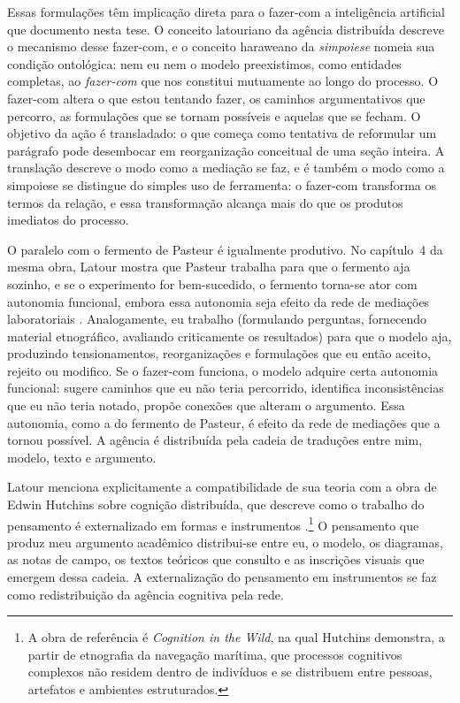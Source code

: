 Essas formulações têm implicação direta para o fazer-com a inteligência artificial que documento nesta tese. O conceito latouriano da agência distribuída descreve o mecanismo desse fazer-com, e o conceito haraweano da \textit{simpoiese} nomeia sua condição ontológica: nem eu nem o modelo preexistimos, como entidades completas, ao \textit{fazer-com} que nos constitui mutuamente ao longo do processo. O fazer-com altera o que estou tentando fazer, os caminhos argumentativos que percorro, as formulações que se tornam possíveis e aquelas que se fecham. O objetivo da ação é transladado: o que começa como tentativa de reformular um parágrafo pode desembocar em reorganização conceitual de uma seção inteira. A translação descreve o modo como a mediação se faz, e é também o modo como a simpoiese se distingue do simples uso de ferramenta: o fazer-com transforma os termos da relação, e essa transformação alcança mais do que os produtos imediatos do processo.

O paralelo com o fermento de Pasteur é igualmente produtivo. No capítulo~4 da mesma obra, Latour mostra que Pasteur trabalha para que o fermento aja sozinho, e se o experimento for bem-sucedido, o fermento torna-se ator com autonomia funcional, embora essa autonomia seja efeito da rede de mediações laboratoriais \parencite{Latour2017Esperanca}. Analogamente, eu trabalho (formulando perguntas, fornecendo material etnográfico, avaliando criticamente os resultados) para que o modelo aja, produzindo tensionamentos, reorganizações e formulações que eu então aceito, rejeito ou modifico. Se o fazer-com funciona, o modelo adquire certa autonomia funcional: sugere caminhos que eu não teria percorrido, identifica inconsistências que eu não teria notado, propõe conexões que alteram o argumento. Essa autonomia, como a do fermento de Pasteur, é efeito da rede de mediações que a tornou possível. A agência é distribuída pela cadeia de traduções entre mim, modelo, texto e argumento.

Latour menciona explicitamente a compatibilidade de sua teoria com a obra de Edwin Hutchins sobre cognição distribuída, que descreve como o trabalho do pensamento é externalizado em formas e instrumentos \parencite{latour2010factish}.\footnote{A obra de referência é \textit{Cognition in the Wild}, na qual Hutchins demonstra, a partir de etnografia da navegação marítima, que processos cognitivos complexos não residem dentro de indivíduos e se distribuem entre pessoas, artefatos e ambientes estruturados.} O pensamento que produz meu argumento acadêmico distribui-se entre eu, o modelo, os diagramas, as notas de campo, os textos teóricos que consulto e as inscrições visuais que emergem dessa cadeia. A externalização do pensamento em instrumentos se faz como redistribuição da agência cognitiva pela rede.


